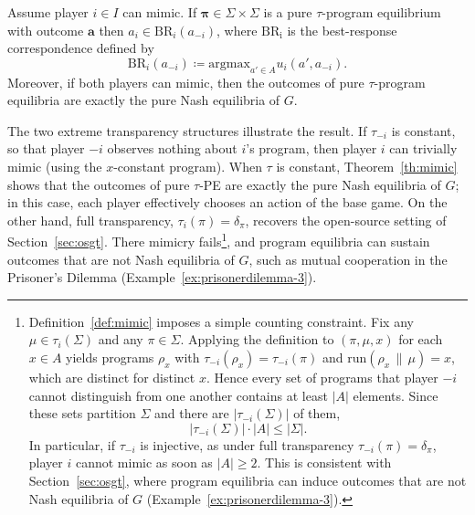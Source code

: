 \documentclass[twoside,11pt]{article}
\begin{document}
\begin{theorem}\label{th:mimic}
    Assume player $i \in I$ can mimic. If $\bm{\pi} \in \Sigma \times \Sigma$ is a pure $\tau$-program equilibrium with outcome $\bm{a}$ then $a_i \in \mathrm{BR}_i(a_{-i})$, where $\mathrm{BR_i}$ is the best-response correspondence defined by
    \begin{equation*}
        \mathrm{BR}_i(a_{-i}) \coloneq \mathrm{argmax}_{a' \in A}u_i(a', a_{-i}).
    \end{equation*}
    Moreover, if both players can mimic, then the outcomes of pure $\tau$-program equilibria are exactly the pure Nash equilibria of $G$.
\end{theorem}

The two extreme transparency structures illustrate the result. If $\tau_{-i}$ is constant, so that player $-i$ observes nothing about $i$'s program, then player $i$ can trivially mimic (using the $x$-constant program). When $\tau$ is constant, Theorem~\ref{th:mimic} shows that the outcomes of pure $\tau$-PE are exactly the pure Nash equilibria of $G$; in this case, each player effectively chooses an action of the base game. On the other hand, full transparency, $\tau_i(\pi) = \delta_\pi$, recovers the open-source setting of Section~\ref{sec:osgt}. There mimicry fails\footnote{Definition~\ref{def:mimic} imposes a simple counting constraint. Fix any $\mu \in \tau_i(\Sigma)$ and any $\pi \in \Sigma$. Applying the definition to $(\pi, \mu, x)$ for each $x \in A$ yields programs $\rho_x$ with $\tau_{-i}(\rho_x) = \tau_{-i}(\pi)$ and $\mathrm{run}(\rho_x \,\|\, \mu) = x$, which are distinct for distinct $x$. Hence every set of programs that player $-i$ cannot distinguish from one another contains at least $|A|$ elements. Since these sets partition $\Sigma$ and there are $|\tau_{-i}(\Sigma)|$ of them,
\begin{equation*}
    |\tau_{-i}(\Sigma)| \cdot |A| \le |\Sigma|.
\end{equation*}
In particular, if $\tau_{-i}$ is injective, as under full transparency $\tau_{-i}(\pi) = \delta_\pi$, player $i$ cannot mimic as soon as $|A| \ge 2$. This is consistent with Section~\ref{sec:osgt}, where program equilibria can induce outcomes that are not Nash equilibria of $G$ (Example~\ref{ex:prisonerdilemma-3}).}, and program equilibria can sustain outcomes that are not Nash equilibria of $G$, such as mutual cooperation in the Prisoner's Dilemma (Example~\ref{ex:prisonerdilemma-3}). 
\end{document}
